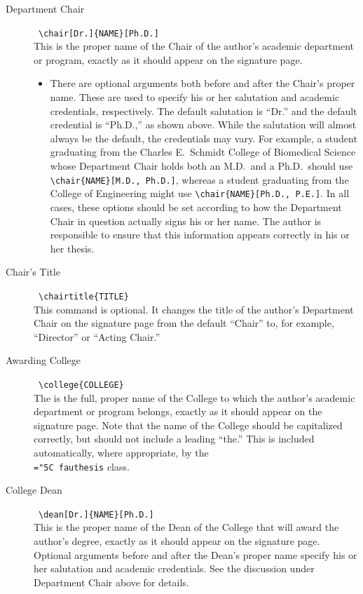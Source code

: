 \documentclass[11pt]{article}
\newcommand\code[1]{{\normalfont\texttt{\let\dv\textsl\chardef\\="5C #1}}}
\begin{document}
\begin{description}
\item[Department Chair] \dotfill\ \verb=\chair[Dr.]{NAME}[Ph.D.]=\\
This is the proper name of the Chair of the author's academic department or program, exactly as it should appear on the signature page.
%
\begin{itemize}
\item There are optional arguments both before and after the Chair's proper name.  These are used to specify his or her salutation and academic credentials, respectively.  The default salutation is ``Dr.'' and the default credential is ``Ph.D.,'' as shown above. While the salutation will almost always be the default, the credentials may vary.  For example, a student graduating from the Charles E.~Schmidt College of Biomedical Science whose Department Chair holds both an M.D.\ and a Ph.D.\ should use \verb=\chair{NAME}[M.D., Ph.D.]=, whereas a student graduating from the College of Engineering might use \verb=\chair{NAME}[Ph.D., P.E.]=.  In all cases, these options should be set according to how the Department Chair in question actually signs his or her name.  The author is responsible to ensure that this information appears correctly in his or her thesis.
\end{itemize}

\item[\llap{*}Chair's Title] \dotfill\ \verb=\chairtitle{TITLE}=\\
This command is optional.  It changes the title of the author's Department Chair on the signature page from the default ``Chair'' to, for example, ``Director'' or ``Acting Chair.''

\item[Awarding College] \dotfill\ \verb=\college{COLLEGE}=\\
The is the full, proper name of the College to which the author's academic department or program belongs, exactly as it should appear on the signature page.  Note that the name of the College should be capitalized correctly, but should not include a leading ``the.''   This is included automatically, where appropriate, by the \code{fauthesis} class.

\item[College Dean] \dotfill\ \verb=\dean[Dr.]{NAME}[Ph.D.]=\\
This is the proper name of the Dean of the College that will award the author's degree, exactly as it should appear on the signature page.  Optional arguments before and after the Dean's proper name specify his or her salutation and academic credentials.  See the discussion under Department Chair above for details.


\end{description}
\end{document}
